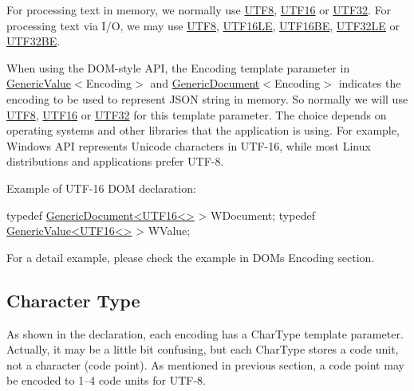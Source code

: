 For processing text in memory, we normally use {\ttfamily \hyperlink{struct_u_t_f8}{U\+T\+F8}}, {\ttfamily \hyperlink{struct_u_t_f16}{U\+T\+F16}} or {\ttfamily \hyperlink{struct_u_t_f32}{U\+T\+F32}}. For processing text via I/O, we may use {\ttfamily \hyperlink{struct_u_t_f8}{U\+T\+F8}}, {\ttfamily \hyperlink{struct_u_t_f16_l_e}{U\+T\+F16\+LE}}, {\ttfamily \hyperlink{struct_u_t_f16_b_e}{U\+T\+F16\+BE}}, {\ttfamily \hyperlink{struct_u_t_f32_l_e}{U\+T\+F32\+LE}} or {\ttfamily \hyperlink{struct_u_t_f32_b_e}{U\+T\+F32\+BE}}.

When using the D\+O\+M-\/style A\+PI, the {\ttfamily Encoding} template parameter in {\ttfamily \hyperlink{class_generic_value}{Generic\+Value}$<$Encoding$>$} and {\ttfamily \hyperlink{class_generic_document}{Generic\+Document}$<$Encoding$>$} indicates the encoding to be used to represent J\+S\+ON string in memory. So normally we will use {\ttfamily \hyperlink{struct_u_t_f8}{U\+T\+F8}}, {\ttfamily \hyperlink{struct_u_t_f16}{U\+T\+F16}} or {\ttfamily \hyperlink{struct_u_t_f32}{U\+T\+F32}} for this template parameter. The choice depends on operating systems and other libraries that the application is using. For example, Windows A\+PI represents Unicode characters in U\+T\+F-\/16, while most Linux distributions and applications prefer U\+T\+F-\/8.

Example of U\+T\+F-\/16 D\+OM declaration\+:


\begin{DoxyCode}
\textcolor{keyword}{typedef} \hyperlink{class_generic_document}{GenericDocument<UTF16<>} > WDocument;
\textcolor{keyword}{typedef} \hyperlink{class_generic_value}{GenericValue<UTF16<>} > WValue;
\end{DoxyCode}


For a detail example, please check the example in D\+OM\textquotesingle{}s Encoding section.\hypertarget{md_Cadriciel_Commun_Externe_RapidJSON_doc_encoding.zh-cn_CharacterType}{}\subsection{Character Type}\label{md_Cadriciel_Commun_Externe_RapidJSON_doc_encoding.zh-cn_CharacterType}
As shown in the declaration, each encoding has a {\ttfamily Char\+Type} template parameter. Actually, it may be a little bit confusing, but each {\ttfamily Char\+Type} stores a code unit, not a character (code point). As mentioned in previous section, a code point may be encoded to 1–4 code units for U\+T\+F-\/8.

